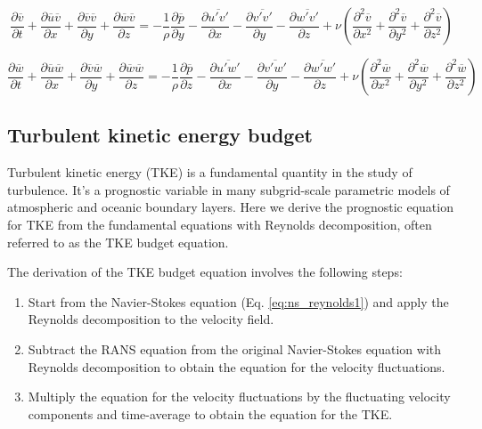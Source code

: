 \documentclass[12pt]{article}
\numberwithin{equation}{section}
\numberwithin{figure}{section}
\numberwithin{table}{section}
\begin{document}
\begin{equation}
  \frac{\partial \overline{v}}{\partial t} + 
  \frac{\partial \overline{u} \overline{v}}{\partial x} +
  \frac{\partial \overline{v} \overline{v}}{\partial y} +
  \frac{\partial \overline{w} \overline{v}}{\partial z} =
  - \frac{1}{\rho} \frac{\partial \overline{p}}{\partial y}
  - \frac{\partial \overline{u'v'}}{\partial x} - \frac{\partial \overline{v'v'}}{\partial y} - \frac{\partial \overline{w'v'}}{\partial z}
  + \nu \left( \frac{\partial^2 \overline{v}}{\partial x^2} + 
               \frac{\partial^2 \overline{v}}{\partial y^2} +
               \frac{\partial^2 \overline{v}}{\partial z^2}
        \right)
\end{equation}

\begin{equation}
  \frac{\partial \overline{w}}{\partial t} + 
  \frac{\partial \overline{u} \overline{w}}{\partial x} +
  \frac{\partial \overline{v} \overline{w}}{\partial y} +
  \frac{\partial \overline{w} \overline{w}}{\partial z} =
  - \frac{1}{\rho} \frac{\partial \overline{p}}{\partial z}
  - \frac{\partial \overline{u'w'}}{\partial x} - \frac{\partial \overline{v'w'}}{\partial y} - \frac{\partial \overline{w'w'}}{\partial z}
  + \nu \left( \frac{\partial^2 \overline{w}}{\partial x^2} + 
               \frac{\partial^2 \overline{w}}{\partial y^2} +
               \frac{\partial^2 \overline{w}}{\partial z^2}
        \right)
\end{equation}

\subsection{Turbulent kinetic energy budget}

Turbulent kinetic energy (TKE) is a fundamental quantity in the study of
turbulence.
It's a prognostic variable in many subgrid-scale parametric models of
atmospheric and oceanic boundary layers.
Here we derive the prognostic equation for TKE from the fundamental equations
with Reynolds decomposition, often referred to as the TKE budget equation.

The derivation of the TKE budget equation involves the following steps:

\begin{enumerate}
  \item Start from the Navier-Stokes equation (Eq. \ref{eq:ns_reynolds1})
  and apply the Reynolds decomposition to the velocity field.
  \item Subtract the RANS equation from the original Navier-Stokes equation
  with Reynolds decomposition to obtain the equation for the velocity
  fluctuations.
  \item Multiply the equation for the velocity fluctuations by the fluctuating
  velocity components and time-average to obtain the equation for the TKE.
\end{enumerate}
\end{document}
